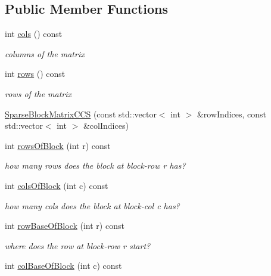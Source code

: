 \subsection*{Public Member Functions}
\begin{DoxyCompactItemize}
\item 
int \mbox{\hyperlink{classg2o_1_1_sparse_block_matrix_c_c_s_a52c6a8fec1da43ee12f74b4704ee470f}{cols}} () const
\begin{DoxyCompactList}\small\item\em columns of the matrix \end{DoxyCompactList}\item 
int \mbox{\hyperlink{classg2o_1_1_sparse_block_matrix_c_c_s_ad98ce4c84411c9982b06a025ad94ce57}{rows}} () const
\begin{DoxyCompactList}\small\item\em rows of the matrix \end{DoxyCompactList}\item 
\mbox{\hyperlink{classg2o_1_1_sparse_block_matrix_c_c_s_abaeeb7ad0ba28f37dba85601882806f1}{Sparse\+Block\+Matrix\+C\+CS}} (const std\+::vector$<$ int $>$ \&row\+Indices, const std\+::vector$<$ int $>$ \&col\+Indices)
\item 
int \mbox{\hyperlink{classg2o_1_1_sparse_block_matrix_c_c_s_a02af79eca0a8b405087947a733b0140c}{rows\+Of\+Block}} (int r) const
\begin{DoxyCompactList}\small\item\em how many rows does the block at block-\/row r has? \end{DoxyCompactList}\item 
int \mbox{\hyperlink{classg2o_1_1_sparse_block_matrix_c_c_s_a3c466f15cdac837586e156c0f2655471}{cols\+Of\+Block}} (int c) const
\begin{DoxyCompactList}\small\item\em how many cols does the block at block-\/col c has? \end{DoxyCompactList}\item 
int \mbox{\hyperlink{classg2o_1_1_sparse_block_matrix_c_c_s_aa687d275090226a00f2685d66d134fcd}{row\+Base\+Of\+Block}} (int r) const
\begin{DoxyCompactList}\small\item\em where does the row at block-\/row r start? \end{DoxyCompactList}\item 
int \mbox{\hyperlink{classg2o_1_1_sparse_block_matrix_c_c_s_a6b25e7158b6d546920161db15d279d67}{col\+Base\+Of\+Block}} (int c) const

\end{DoxyCompactItemize}
